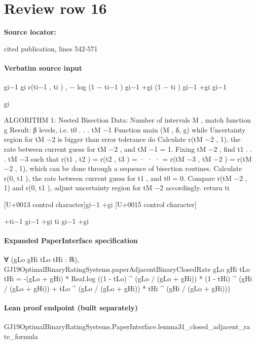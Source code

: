 \documentclass[10pt]{article}
\begin{document}
\section*{Review row 16}
\textbf{Source locator:} {\footnotesize\raggedright cited publication, lines 542-\allowbreak{}571\par}
\paragraph{Verbatim source input}
\begin{ReviewVerbatim}
gi−1
gi
r(ti−1 , ti ) , − log (1 − ti−1 ) gi−1 +gi (1 − ti ) gi−1 +gi
gi−1

gi

ALGORITHM 1: Nested Bisection
Data: Number of intervals M , match function g
Result: β levels, i.e. {t0 . . . tM −1 }
Function main (M , δ, g)
while Uncertainty region for tM −2 is bigger
than error tolerance do
Calculate r(tM −2 , 1), the rate between
current guess for tM −2 , and tM −1 = 1.
Fixing tM −2 , find t1 . . . tM −3 such that
r(t1 , t2 ) = r(t2 , t3 ) = · · · =
r(tM −3 , tM −2 ) = r(tM −2 , 1), which can be
done through a sequence of bisection
routines.
Calculate r(0, t1 ), the rate between current
guess for t1 , and t0 = 0.
Compare r(tM −2 , 1) and r(0, t1 ), adjust
uncertainty region for tM −2 accordingly.
return {ti }

[U+0013 control character]gi−1 +gi [U+0015 control character]

+ti−1 gi−1 +gi ti gi−1 +gi
\end{ReviewVerbatim}


\paragraph{Expanded PaperInterface specification}
\begin{ReviewVerbatim}
∀ (gLo gHi tLo tHi : ℝ),
  GJ19OptimalBinaryRatingSystems.paperAdjacentBinaryClosedRate gLo gHi tLo tHi =
    -(gLo + gHi) *
      Real.log
        ((1 - tLo) ^ (gLo / (gLo + gHi)) * (1 - tHi) ^ (gHi / (gLo + gHi)) +
          tLo ^ (gLo / (gLo + gHi)) * tHi ^ (gHi / (gLo + gHi)))
\end{ReviewVerbatim}

\paragraph{Lean proof endpoint (built separately)}\begin{ReviewVerbatim}
GJ19OptimalBinaryRatingSystems.PaperInterface.lemma31_closed_adjacent_rate_formula
\end{ReviewVerbatim}
\end{document}
